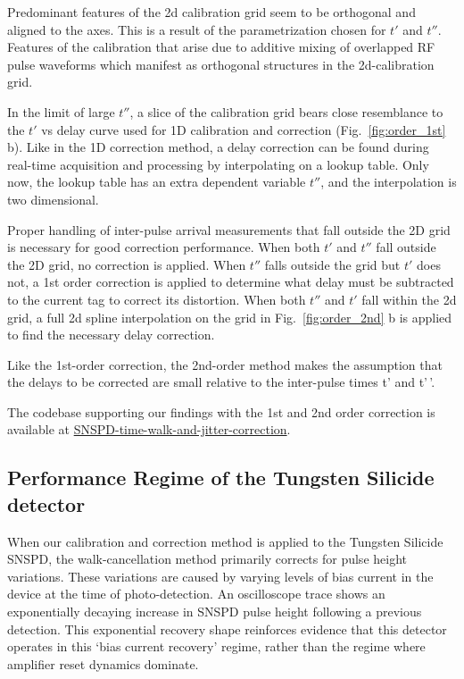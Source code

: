 \documentclass[11pt]{caltech_thesis} %
\begin{document}
Predominant features of the 2d calibration grid seem to be orthogonal and aligned to the axes. This is a result of the parametrization chosen for $t'$ and $t''$. Features of the calibration that arise due to additive mixing of overlapped RF pulse waveforms which manifest as orthogonal structures in the 2d-calibration grid.

In the limit of large $t''$, a slice of the calibration grid bears close resemblance to the $t'$ vs delay curve used for 1D calibration and correction (Fig.~\ref{fig:order_1st} b). Like in the 1D correction method, a delay correction can be found during real-time acquisition and processing by interpolating on a lookup table. Only now, the lookup table has an extra dependent variable $t''$, and the interpolation is two dimensional.

Proper handling of inter-pulse arrival measurements that fall outside the 2D grid is necessary for good correction performance. When both $t'$ and $t''$ fall outside the 2D grid, no correction is applied. When $t''$ falls outside the grid but $t'$ does not, a 1st order correction is applied to determine what delay must be subtracted to the current tag to correct its distortion. When both $t''$ and $t'$ fall within the 2d grid, a full 2d spline interpolation on the grid in Fig.~\ref{fig:order_2nd} b is applied to find the necessary delay correction.

Like the 1st-order correction, the 2nd-order method makes the assumption that the delays to be corrected are small relative to the inter-pulse times t' and t'\,'.

The codebase supporting our findings with the 1st and 2nd order correction is
available at \href{https://github.com/sansseriff/SNSPD-time-walk-and-jitter-correction}{SNSPD-time-walk-and-jitter-correction}.

{}

\hypertarget{performance-regime-of-the-tungsten-silicide-detector}{%
\subsection{Performance Regime of the Tungsten Silicide detector}\label{performance-regime-of-the-tungsten-silicide-detector}}

When our calibration and correction method is applied to the Tungsten Silicide SNSPD, the walk-cancellation method primarily corrects for pulse height variations. These variations are caused by varying levels of bias current in the device at the time of photo-detection. An oscilloscope trace shows an exponentially decaying increase in SNSPD pulse height following a previous detection. This exponential recovery shape reinforces evidence that this detector operates in this `bias current recovery' regime, rather than the regime where amplifier reset dynamics dominate.
\end{document}
